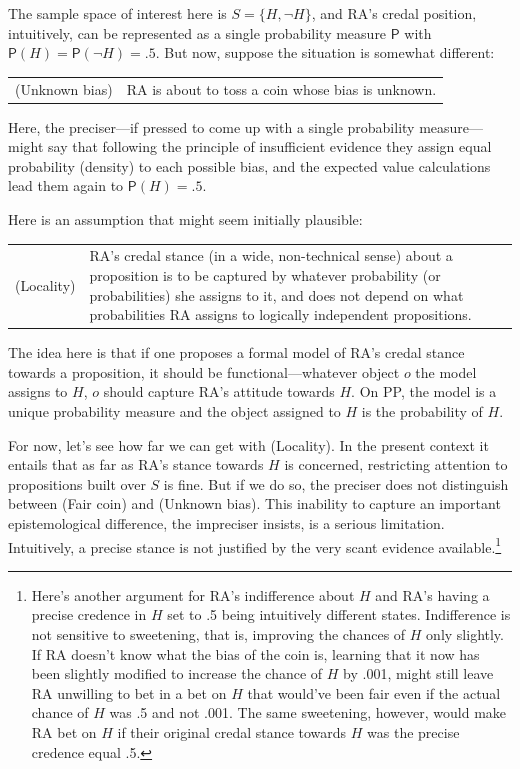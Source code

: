 \documentclass[
  10pt,
  dvipsnames,enabledeprecatedfontcommands]{scrartcl}
\newcommand{\pr}[1]{\mathsf{P}(#1)}
\begin{document}
\noindent The sample space of interest here is \(S = \{ H, \neg H\}\),
and RA's credal position, intuitively, can be represented as a single
probability measure \(\mathsf{P}\) with
\(\mathsf{P}(H) = \mathsf{P}(\neg H)=.5\). But now, suppose the
situation is somewhat different:

\begin{center}
\begin{tabular}{lp{9cm}}
(Unknown bias) & RA is about to toss a coin whose bias is unknown.
\end{tabular}
\end{center}

Here, the preciser---if pressed to come up with a single probability
measure---might say that following the principle of insufficient
evidence they assign equal probability (density) to each possible bias,
and the expected value calculations lead them again to \(\pr{H}=.5\).

Here is an assumption that might seem initially plausible:

\begin{tabular}{lp{11cm}}
(Locality) & RA's credal stance (in a wide, non-technical sense) about a proposition is to be captured by whatever probability (or probabilities) she assigns to it, and does not depend on what probabilities RA assigns to logically independent  propositions.
\end{tabular}

\noindent The idea here is that if one proposes a formal model of RA's
credal stance towards a proposition, it should be functional---whatever
object \(o\) the model assigns to \(H\), \(o\) should capture RA's
attitude towards \(H\). On PP, the model is a unique probability measure
and the object assigned to \(H\) is the probability of \(H\).

For now, let's see how far we can get with (Locality). In the present
context it entails that as far as RA's stance towards \(H\) is
concerned, restricting attention to propositions built over \(S\) is
fine. But if we do so, the preciser does not distinguish between (Fair
coin) and (Unknown bias). This inability to capture an important
epistemological difference, the impreciser insists, is a serious
limitation. Intuitively, a precise stance is not justified by the very
scant evidence available.\footnote{Here's another argument for RA's
  indifference about \(H\) and RA's having a precise credence in \(H\)
  set to .5 being intuitively different states. Indifference is not
  sensitive to sweetening, that is, improving the chances of \(H\) only
  slightly. If RA doesn't know what the bias of the coin is, learning
  that it now has been slightly modified to increase the chance of \(H\)
  by .001, might still leave RA unwilling to bet in a bet on \(H\) that
  would've been fair even if the actual chance of \(H\) was .5 and not
  .001. The same sweetening, however, would make RA bet on \(H\) if
  their original credal stance towards \(H\) was the precise credence
  equal .5.}
\end{document}
